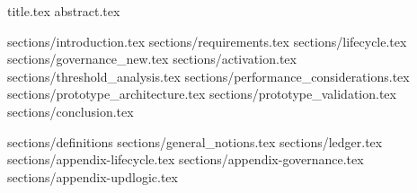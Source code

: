 \documentclass{llncs}
\begin{document}
{title.tex}
{abstract.tex}

\clearpage

\tableofcontents
\listoffigures
\listoftables

\clearpage
{sections/introduction.tex}
{sections/requirements.tex}
{sections/lifecycle.tex}
{sections/governance_new.tex}
{sections/activation.tex}
{sections/threshold_analysis.tex}
{sections/performance_considerations.tex}
{sections/prototype_architecture.tex}
{sections/prototype_validation.tex}
{sections/conclusion.tex}
\clearpage


\appendix
{sections/definitions}
{sections/general_notions.tex}
{sections/ledger.tex}
{sections/appendix-lifecycle.tex}
{sections/appendix-governance.tex}
{sections/appendix-updlogic.tex}
\end{document}
